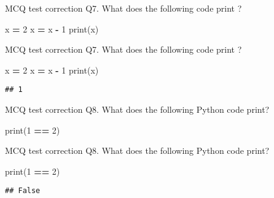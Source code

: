 \documentclass[
  8pt,
  ignorenonframetext,
]{beamer}
\newenvironment{Shaded}{\begin{snugshade}}{\end{snugshade}}
\newcommand{\BuiltInTok}[1]{#1}
\newcommand{\DecValTok}[1]{\textcolor[rgb]{0.00,0.00,0.81}{#1}}
\newcommand{\NormalTok}[1]{#1}
\newcommand{\OperatorTok}[1]{\textcolor[rgb]{0.81,0.36,0.00}{\textbf{#1}}}
\begin{document}
\begin{frame}[fragile]{MCQ test correction}
\protect\hypertarget{mcq-test-correction-12}{}
Q7. What does the following code print ?

\begin{Shaded}
\begin{Highlighting}[]
\NormalTok{x }\OperatorTok{=} \DecValTok{2}
\NormalTok{x }\OperatorTok{=}\NormalTok{ x }\OperatorTok{{-}} \DecValTok{1}
\BuiltInTok{print}\NormalTok{(x)}
\end{Highlighting}
\end{Shaded}
\end{frame}

\begin{frame}[fragile]{MCQ test correction}
\protect\hypertarget{mcq-test-correction-13}{}
Q7. What does the following code print ?

\begin{Shaded}
\begin{Highlighting}[]
\NormalTok{x }\OperatorTok{=} \DecValTok{2}
\NormalTok{x }\OperatorTok{=}\NormalTok{ x }\OperatorTok{{-}} \DecValTok{1}
\BuiltInTok{print}\NormalTok{(x)}
\end{Highlighting}
\end{Shaded}

\begin{verbatim}
## 1
\end{verbatim}
\end{frame}

\begin{frame}[fragile]{MCQ test correction}
\protect\hypertarget{mcq-test-correction-14}{}
Q8. What does the following Python code print?

\begin{Shaded}
\begin{Highlighting}[]
\BuiltInTok{print}\NormalTok{(}\DecValTok{1} \OperatorTok{==} \DecValTok{2}\NormalTok{)}
\end{Highlighting}
\end{Shaded}
\end{frame}

\begin{frame}[fragile]{MCQ test correction}
\protect\hypertarget{mcq-test-correction-15}{}
Q8. What does the following Python code print?

\begin{Shaded}
\begin{Highlighting}[]
\BuiltInTok{print}\NormalTok{(}\DecValTok{1} \OperatorTok{==} \DecValTok{2}\NormalTok{)}
\end{Highlighting}
\end{Shaded}

\begin{verbatim}
## False
\end{verbatim}
\end{frame}
\end{document}
